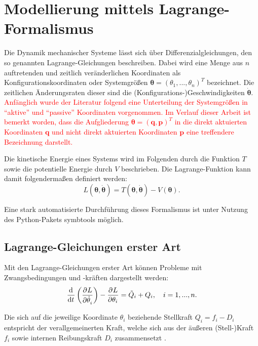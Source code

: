 \section{Modellierung mittels Lagrange-Formalismus}
Die Dynamik mechanischer Systeme lässt sich über Differenzialgleichungen, den so genannten Lagrange-Gleichungen beschreiben. Dabei wird eine Menge aus $n$ auftretenden und zeitlich veränderlichen Koordinaten als Konfigurationskoordinaten oder Systemgrößen $\mathbf{\theta} = (\theta_1, ..., \theta_n)^T$ bezeichnet. Die zeitlichen Änderungsraten dieser sind die (Konfigurations-)Geschwindigkeiten $\dot{\mathbf{\theta}}$. \textcolor{red}{Anfänglich wurde der Literatur \cite[S.10]{DissKnoll} folgend eine Unterteilung der Systemgrößen in ``aktive'' und ``passive'' Koordinaten vorgenommen. Im Verlauf dieser Arbeit ist bemerkt worden, dass die 
Aufgliederung $\mathbf{\theta} = (\mathbf{q}, \mathbf{p})^T$ in die direkt aktuierten Koordinaten $\mathbf{q}$ und nicht direkt aktuierten Koordinaten $\mathbf{p}$ eine treffendere Bezeichnung darstellt.}
\cite[S.7]{DissKnoll} 

Die kinetische Energie eines Systems wird im Folgenden durch die Funktion $T$ sowie die potentielle Energie durch $V$ beschrieben. Die Lagrange-Funktion kann damit folgendermaßen definiert werden:
\begin{equation}
L(\mathbf{\theta}, \dot{\mathbf{\theta}}) = T(\mathbf{\theta}, \dot{\mathbf{\theta}}) - V(\mathbf{\theta}).
\end{equation}

Eine stark automatisierte Durchführung dieses Formalismus ist unter Nutzung des Python-Pakets symbtools \cite{symbtools} möglich.

\subsection{Lagrange-Gleichungen erster Art}
\label{sec:Lagrange1_theory}

Mit den Lagrange-Gleichungen erster Art können Probleme mit Zwangsbedingungen und -kräften dargestellt werden:
\begin{equation}
	\frac{\mathrm{d}^{}}{\mathrm{d}{t}^{}}\left(\frac{\partial^{}L}{\partial{\dot{\theta}_i}^{}} \right) - \frac{\partial^{}L}{\partial{\theta_i}^{}} = \tilde{Q}_i + Q_i, \quad i = 1, ..., n.
\end{equation}

Die sich auf die jeweilige Koordinate $\theta_i$ beziehende Stellkraft $Q_i = f_i - D_i$ entspricht der verallgemeinerten Kraft, welche sich aus der äußeren (Stell-)Kraft $f_i$ sowie internen Reibungskraft $D_i$ zusammensetzt \cite[S. 49]{Lagrange}.

